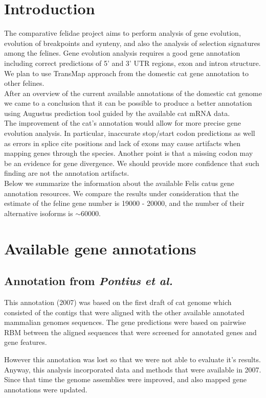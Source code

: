 \documentclass{article}
\begin{document}
\large
\centerline{}
\vspace*{20pt}
\section{Introduction}
The comparative felidae project aims to perform analysis of gene evolution, evolution of breakpoints and synteny, and also the analysis of selection signatures among the felines. Gene evolution analysis requires a good gene annotation including correct predictions of 5' and 3' UTR regions, exon and intron structure. 
We plan to use TransMap approach from the domestic cat gene annotation to other felines. \\
After an overview of the current available annotations of the domestic cat genome we came to a conclusion that it can be possible to produce a better annotation using Augustus prediction tool guided by the available cat mRNA data. \\
The improvement of the cat's annotation would allow for more precise gene evolution analysis.  In particular, inaccurate stop/start codon predictions as well as errors in splice cite positions and lack of exons may cause artifacts when mapping genes through the species. Another point is that a missing codon may be an evidence for gene divergence. We should provide more confidence that such finding are not the annotation artifacts.\\
Below we summarize the information about the available Felis catus gene annotation resources. We compare the results under consideration that the estimate of the feline gene number is 19000 - 20000, and the number of their alternative isoforms is $\sim$60000.


\section{Available gene annotations}
\subsection{Annotation from \textit{Pontius et al.}}
This annotation (2007) was based on the first draft of cat genome which consisted of the contigs that were aligned with the other available annotated mammalian genomes sequences. The gene predictions were based on pairwise RBM between the aligned sequences that were screened for annotated genes and gene features.

However this annotation was lost so that we were not able to evaluate it’s results. Anyway, this analysis incorporated data and methods that were available in 2007. Since that time the genome assemblies were improved,  and also mapped gene annotations were updated.
\end{document}
